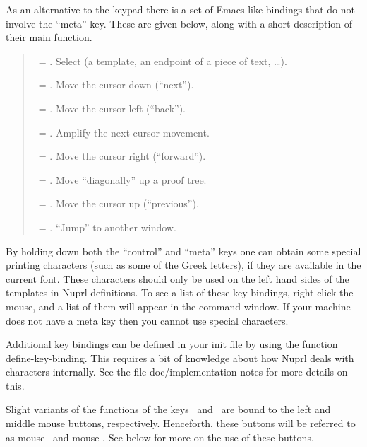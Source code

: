 As an alternative to the keypad there is a set of Emacs-like bindings that
do not involve the ``meta'' key.  These are given below, along with a
short description of their main function.  
\begin{quote}\protect
\SEL\ = .  Select (a template, an endpoint of a piece of text, \ldots).

\DOWN\ = .  Move the cursor down (``next'').

\LEFT\ = .  Move the cursor left (``back'').

\LONG\ = .  Amplify the next cursor movement.

\RIGHT\ = .  Move the cursor right (``forward'').

\DIAG\ = .  Move ``diagonally'' up a proof tree.

\UP\ = .  Move the cursor up (``previous'').

\JUMP\ = .  ``Jump'' to another window.
\end{quote}

By holding down both the ``control'' and ``meta'' keys one can obtain some
special printing characters (such as some of the Greek letters), if they
are available in the current font.  These characters should only be used on
the left hand sides of the templates in Nuprl definitions.  To see a list
of these key bindings, right-click the mouse, and a list of them will
appear in the command window.  If your machine does not have a meta key
then you cannot use special characters.

Additional key bindings can be defined in your init file by using the
function define-key-binding.  This requires a bit of knowledge about how
Nuprl deals with characters internally.  See the file
doc/implementation-notes for more details on this.

Slight variants of the functions of the keys \SEL\ and \JUMP\ are bound to
the left and middle mouse buttons, respectively.  Henceforth, these buttons
will be referred to as mouse-\SEL\ and mouse-\JUMP.  See below for more on
the use of these buttons.


